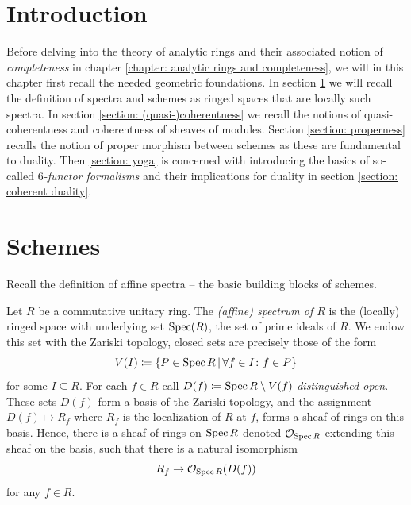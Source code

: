 
\section*{Introduction}
Before delving into the theory of analytic rings and their associated notion of \emph{completeness} in chapter \ref{chapter: analytic rings and completeness}, we will in this chapter first recall the needed geometric foundations. In section \ref{section: schemes} we will recall the definition of spectra and schemes as ringed spaces that are locally such spectra. In section \ref{section: (quasi-)coherentness} we recall the notions of quasi-coherentness and coherentness of sheaves of modules. Section \ref{section: properness} recalls the notion of proper morphism between schemes as these are fundamental to duality. Then \ref{section: yoga} is concerned with introducing the basics of so-called \emph{$6$-functor formalisms} and their implications for duality in section \ref{section: coherent duality}.

\section{Schemes}
\label{section: schemes}

Recall the definition of affine spectra -- the basic building blocks of schemes.
\begin{definition}
	\label{definition: affine spectra}
	
	Let $R$ be a commutative unitary ring. The \emph{(affine) spectrum of $R$} is the (locally) ringed space with underlying set $\operatorname{Spec}(R)$, the set of prime ideals of $R$. We endow this set with the Zariski topology, \ie closed sets are precisely those of the form
	$$V(I) \coloneqq \{P \in \operatorname{Spec} R \,\vert\, \forall f\in I\colon f\in P\}$$
	for some $I\subseteq R$. For each $f\in R$ call $D(f)\coloneqq \operatorname{Spec} R\setminus V(f)$ \emph{distinguished open}. These sets $D(f)$ form a basis of the Zariski topology, and the assignment $D(f)\mapsto R_f$ where $R_f$ is the localization of $R$ at $f$, forms a sheaf of rings on this basis. Hence, there is a sheaf of rings on $\operatorname{Spec} R$ denoted ${{\mathcal{O}}_{\operatorname{Spec} R}}$ extending this sheaf on the basis, \ie such that there is a natural isomorphism
	$$R_f \to {{\mathcal{O}}_{\operatorname{Spec}R}}(D(f))$$
	for any $f\in R$.
\end{definition}

